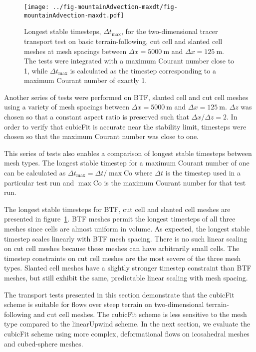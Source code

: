 \begin{figure}
	\centering
	\texttt{[image: ../fig-mountainAdvection-maxdt/fig-mountainAdvection-maxdt.pdf]}
	\caption{Longest stable timesteps, $\Delta t_\mathrm{max}$, for the two-dimensional tracer transport test on basic terrain-following, cut cell and slanted cell meshes at mesh spacings between $\Delta x = \SI{5000}{\meter}$ and $\Delta x = \SI{125}{\meter}$.  The tests were integrated with a maximum Courant number close to 1, while $\Delta t_\mathrm{max}$ is calculated as the timestep corresponding to a maximum Courant number of exactly 1.
	}
	\label{fig:mountainAdvection-maxdt}
\end{figure}

Another series of tests were performed on BTF, slanted cell and cut cell meshes using a variety of mesh spacings between $\Delta x = \SI{5000}{\meter}$ and $\Delta x = \SI{125}{\meter}$.  $\Delta z$ was chosen so that a constant aspect ratio is preserved such that $\Delta x / \Delta z = 2$.  In order to verify that cubicFit is accurate near the stability limit, timesteps were chosen so that the maximum Courant number was close to one.  

This series of tests also enables a comparison of longest stable timesteps between mesh types.  The longest stable timestep for a maximum Courant number of one can be calculated as $\Delta t_\mathrm{max} = \Delta t / \max{\mathrm{Co}}$ where $\Delta t$ is the timestep used in a particular test run and $\max{\mathrm{Co}}$ is the maximum Courant number for that test run.

The longest stable timesteps for BTF, cut cell and slanted cell meshes are presented in figure~\ref{fig:mountainAdvection-maxdt}.  BTF meshes permit the longest timesteps of all three meshes since cells are almost uniform in volume.  As expected, the longest stable timestep scales linearly with BTF mesh spacing.
There is no such linear scaling on cut cell meshes because these meshes can have arbitrarily small cells.  The timestep constraints on cut cell meshes are the most severe of the three mesh types.  Slanted cell meshes have a slightly stronger timestep constraint than BTF meshes, but still exhibit the same, predictable linear scaling with mesh spacing.

The transport tests presented in this section demonstrate that the cubicFit scheme is suitable for flows over steep terrain on two-dimensional terrain-following and cut cell meshes.  The cubicFit scheme is less sensitive to the mesh type compared to the linearUpwind scheme.  In the next section, we evaluate the cubicFit scheme using more complex, deformational flows on icosahedral meshes and cubed-sphere meshes.

